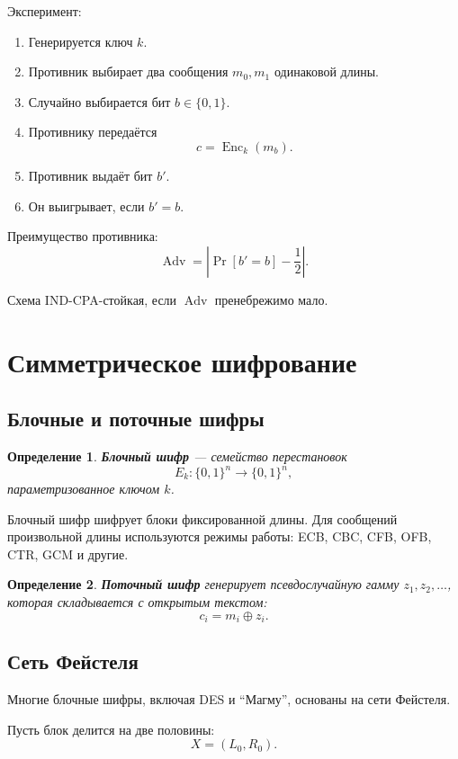 \documentclass[12pt,a4paper]{article}
\newtheorem{definition}{Определение}
\DeclareMathOperator{\Enc}{Enc}
\DeclareMathOperator{\Adv}{Adv}
\begin{document}
Эксперимент:

\begin{enumerate}
    \item Генерируется ключ $k$.
    \item Противник выбирает два сообщения $m_0,m_1$ одинаковой длины.
    \item Случайно выбирается бит $b \in \{0,1\}$.
    \item Противнику передаётся
    \[
        c = \Enc_k(m_b).
    \]
    \item Противник выдаёт бит $b'$.
    \item Он выигрывает, если $b'=b$.
\end{enumerate}

Преимущество противника:
\[
    \Adv = \left|\Pr[b'=b]-\frac12\right|.
\]

Схема IND-CPA-стойкая, если $\Adv$ пренебрежимо мало.

\section{Симметрическое шифрование}

\subsection{Блочные и поточные шифры}

\begin{definition}
\textbf{Блочный шифр} --- семейство перестановок
\[
    E_k : \{0,1\}^n \to \{0,1\}^n,
\]
параметризованное ключом $k$.
\end{definition}

Блочный шифр шифрует блоки фиксированной длины. Для сообщений произвольной длины используются режимы работы: ECB, CBC, CFB, OFB, CTR, GCM и другие.

\begin{definition}
\textbf{Поточный шифр} генерирует псевдослучайную гамму $z_1,z_2,\ldots$, которая складывается с открытым текстом:
\[
    c_i = m_i \oplus z_i.
\]
\end{definition}

\subsection{Сеть Фейстеля}

Многие блочные шифры, включая DES и ``Магму'', основаны на сети Фейстеля.

Пусть блок делится на две половины:
\[
    X = (L_0,R_0).
\]
\end{document}
